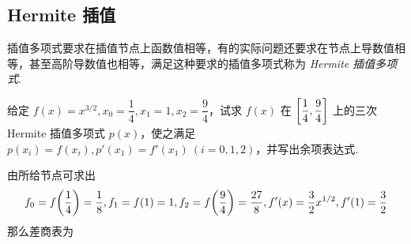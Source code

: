 \subsection{Hermite 插值}

插值多项式要求在插值节点上函数值相等，有的实际问题还要求在节点上导数值相等，甚至高阶导数值也相等，满足这种要求的插值多项式称为 \textit{Hermite 插值多项式}.

\begin{example}
    给定 $f(x)=x^{3/2},x_0=\dfrac{1}{4},x_1=1,x_2=\dfrac{9}{4}$，\label{fxx32x014}试求 $f(x)$ 在 $\qty[\dfrac{1}{4},\dfrac{9}{4}]$ 上的三次 Hermite 插值多项式 $p(x)$，使之满足
    $p(x_i)=f(x_i),p'(x_1)=f'(x_1)~ (i=0,1,2)$，并写出余项表达式.
\end{example}
\begin{solution}
    由所给节点可求出 $$f_0=f\qty(\dfrac{1}{4})=\dfrac{1}{8},f_1=f(1)=1,f_2=f\qty(\dfrac{9}{4})=\dfrac{27}{8},f'(x)=\dfrac{3}{2}x^{1/2},f'(1)=\dfrac{3}{2}$$
    那么差商表为
    \begin{table}[H]
        \centering
        \caption{}

\end{table}
\end{solution}
